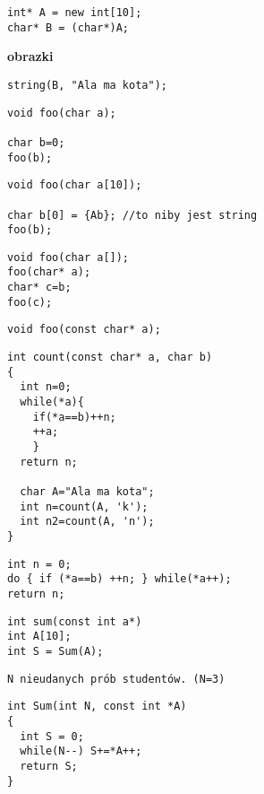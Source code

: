 \documentclass[11pt]{article}
\begin{document}
\hline
\begin{verbatim}
int* A = new int[10];
char* B = (char*)A;
\end{verbatim}
\textbf{obrazki}
\begin{verbatim}
string(B, "Ala ma kota");
\end{verbatim}

\hline

\begin{verbatim}
void foo(char a);

char b=0;
foo(b);
\end{verbatim}

\hline

\begin{verbatim}
void foo(char a[10]);

char b[0] = {Ab}; //to niby jest string
foo(b);
\end{verbatim}
\hline

\begin{verbatim}
void foo(char a[]);
foo(char* a);
char* c=b;
foo(c);
\end{verbatim}

\hline
\begin{verbatim}
void foo(const char* a);
\end{verbatim}

\newpage
\hline
\begin{verbatim}
int count(const char* a, char b)
{
  int n=0;
  while(*a){
    if(*a==b)++n;
    ++a;
    }
  return n;

  char A="Ala ma kota";
  int n=count(A, 'k');
  int n2=count(A, 'n');
}
\end{verbatim}
\hline
\begin{verbatim}
int n = 0;
do { if (*a==b) ++n; } while(*a++);
return n;
\end{verbatim}
\hline
\begin{verbatim}
int sum(const int a*)
int A[10];
int S = Sum(A);
\end{verbatim}
\begin{verbatim}
N nieudanych prób studentów. (N=3)
\end{verbatim}


\hline
\begin{verbatim}
int Sum(int N, const int *A)
{
  int S = 0;
  while(N--) S+=*A++;
  return S;
}
\end{verbatim}
\end{document}
